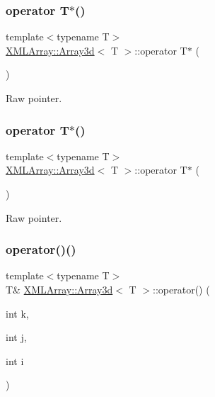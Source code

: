 \subsubsection{\texorpdfstring{operator T$\ast$()}{operator T*()}\hspace{0.1cm}{\footnotesize\ttfamily [2/3]}}
{\footnotesize\ttfamily template$<$typename T$>$ \\
\mbox{\hyperlink{classXMLArray_1_1Array3d}{X\+M\+L\+Array\+::\+Array3d}}$<$ T $>$\+::operator T$\ast$ (\begin{DoxyParamCaption}{ }\end{DoxyParamCaption})\hspace{0.3cm}{\ttfamily [inline]}}



Raw pointer. 

\mbox{\label{classXMLArray_1_1Array3d_aec4e2efc011195e91a742b7fa33bbbdb}} 
\subsubsection{\texorpdfstring{operator T$\ast$()}{operator T*()}\hspace{0.1cm}{\footnotesize\ttfamily [3/3]}}
{\footnotesize\ttfamily template$<$typename T$>$ \\
\mbox{\hyperlink{classXMLArray_1_1Array3d}{X\+M\+L\+Array\+::\+Array3d}}$<$ T $>$\+::operator T$\ast$ (\begin{DoxyParamCaption}{ }\end{DoxyParamCaption})\hspace{0.3cm}{\ttfamily [inline]}}



Raw pointer. 

\mbox{\label{classXMLArray_1_1Array3d_a2c17e47922ca191dbce50300c6dd6785}} 
\subsubsection{\texorpdfstring{operator()()}{operator()()}\hspace{0.1cm}{\footnotesize\ttfamily [1/6]}}
{\footnotesize\ttfamily template$<$typename T$>$ \\
T\& \mbox{\hyperlink{classXMLArray_1_1Array3d}{X\+M\+L\+Array\+::\+Array3d}}$<$ T $>$\+::operator() (\begin{DoxyParamCaption}\item[{int}]{k,  }\item[{int}]{j,  }\item[{int}]{i }\end{DoxyParamCaption})\hspace{0.3cm}{\ttfamily [inline]}}



